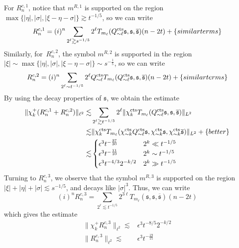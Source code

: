 \documentclass[letterpaper, reqno,final]{amsart}
\newcommand{\fs}{\mathfrak{s}}
\newcommand{\tcts}{\text{cts}}
\newcommand{\Rncp}[1]{R_n^{c,{#1}}}
\newcommand{\btext}[1]{\left\{\textup{#1}\right\}}
\newcommand{\bbetter}{\btext{better}}
\newcommand{\bsim}{\btext{similar terms}}
\begin{document}
For $\Rncp{1}$, notice that $m^{R,1}$ is supported on the region $\max\{|\eta|,|\sigma|,|\xi - \eta - \sigma|\} \gtrsim t^{-1/5}$, so we can write
\begin{equation*}
    \Rncp{1} = (i)^n \sum_{2^\ell \gtrsim s^{-1/5}} 2^\ell T_{m_\ell}(Q_{\sim \ell}^\tcts\fs, \fs, \overline{\fs})(n - 2t) + \bsim
\end{equation*}
Similarly, for~$\Rncp{2}$, the symbol $m^{R,2}$ is supported in the region $|\xi| \sim \max\{|\eta|, |\sigma|, |\xi - \eta - \sigma|\} \sim s^{-\frac{1}{5}}$, so we can write
\begin{equation*}
    \Rncp{2} = (i)^n \sum_{2^\ell \sim t^{-1/5}} 2^\ell Q_{\sim \ell}^\tcts {T}_{m_\ell}(Q_{\sim \ell}^\tcts \fs, \fs, \overline{\fs})(n-2t) + \bsim
\end{equation*}
By using the decay properties of $\fs$, we obtain the estimate
\begin{equation}\label{eqn:rncp-1-2-decay-ests}\begin{split}
    \lVert \chi_{k}^+ (\Rncp{1} + \Rncp{2}) \rVert_{\ell^2} \lesssim& \sum_{2^\ell \gtrsim t^{-1/5}} 2^\ell \lVert \chi_{k}^\tcts T_{m_\ell}(Q_{\sim \ell}^\tcts\fs, \fs, \overline{\fs})\rVert_{L^2}\\
    \lesssim& \lVert \chi_{k}^\tcts T_{m_\ell} (\chi_{\sim k}^\tcts Q_{\sim \ell}^\tcts\fs, \chi_{\sim k}^\tcts\fs, \chi_{\sim k}^\tcts\overline{\fs})\rVert_{L^2} + \bbetter\\
    \lesssim& \begin{cases}
        \epsilon^3 t^{-\frac{37}{30}} & 2^k \ll t^{-1/5}\\
        \epsilon^3 t^{-\frac{11}{10}} & 2^k \sim t^{-1/5}\\
        \epsilon^3 t^{-4/3} 2^{-k/2} & 2^k \gg t^{-1/5}
    \end{cases}
\end{split}\end{equation}
Turning to $\Rncp{3}$, we observe that the symbol $m^{R,3}$ is supported on the region $|\xi| + |\eta| +| \sigma| \lesssim s^{-1/5}$, and decays like $|\sigma|^3$.  Thus, we can write
\begin{equation*}
    (i)^n\Rncp{3} = \sum_{2^\ell \lesssim t^{-1/5}}2^{3\ell} {T}_{m_\ell}(\fs,\fs,\overline{\fs})(n-2t)
\end{equation*}
which gives the estimate
\begin{equation}\label{eqn:rncp-3-decay-bds}\begin{split}
    \lVert \chi^+_k \Rncp{3} \rVert_{\ell^2} \lesssim& \epsilon^3 t^{-8/5} 2^{-k/2}\\
    \lVert \Rncp{3} \rVert_{\ell^2} \lesssim& \epsilon^3 t^{-\frac{19}{15}}
\end{split}\end{equation}
\end{document}
